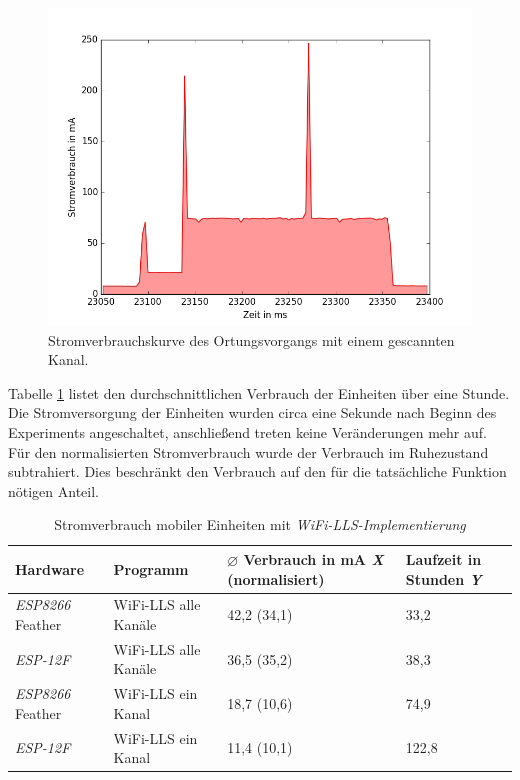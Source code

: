 \begin{figure}[h!]
  \centering
	\includegraphics[width=\textwidth]{plots/wifills1chsend.png}
  \caption{Stromverbrauchskurve des Ortungsvorgangs mit einem gescannten Kanal.}
  \label{fig:wifills1chsend}
\end{figure}

Tabelle \ref{table:wifillsina} listet den durchschnittlichen Verbrauch der Einheiten über eine Stunde.
Die Stromversorgung der Einheiten wurden circa eine Sekunde nach Beginn des Experiments angeschaltet, anschließend treten keine Veränderungen mehr auf.
Für den normalisierten Stromverbrauch wurde der Verbrauch im Ruhezustand subtrahiert. 
Dies beschränkt den Verbrauch auf den für die tatsächliche Funktion nötigen Anteil.

\begin{table}[h!]
	\centering
	\caption{Stromverbrauch mobiler Einheiten mit \emph{WiFi-LLS-Implementierung}}
	\label{table:wifillsina}
	\begin{tabular}{l|l|p{2.5cm}|p{2.5cm}}
		Hardware & Programm & $\varnothing$ Verbrauch in mA \emph{X} (normalisiert) & Laufzeit in Stunden \emph{Y} \\
		\hline
		\emph{ESP8266} Feather & WiFi-LLS alle Kanäle & 42,2 (34,1) & 33,2\\
		\emph{ESP-12F} & WiFi-LLS alle Kanäle & 36,5 (35,2) & 38,3\\
		\emph{ESP8266} Feather & WiFi-LLS ein Kanal & 18,7 (10,6)& 74,9\\
		\emph{ESP-12F} & WiFi-LLS ein Kanal & 11,4 (10,1) & 122,8\\
	\end{tabular}
\end{table}

